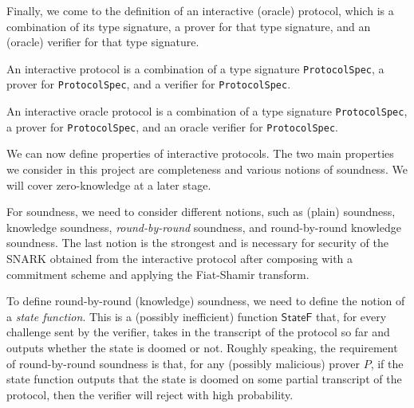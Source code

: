 Finally, we come to the definition of an interactive (oracle) protocol, which is a combination of its type signature, a prover for that type signature, and an (oracle) verifier for that type signature.

\begin{definition}
    \label{def:interactive_protocol}
    An interactive protocol is a combination of a type signature \verb|ProtocolSpec|, a prover for \verb|ProtocolSpec|, and a verifier for \verb|ProtocolSpec|.
\end{definition}

\begin{definition}\label{def:interactive_oracle_protocol}
    An interactive oracle protocol is a combination of a type signature \verb|ProtocolSpec|, a prover for \verb|ProtocolSpec|, and an oracle verifier for \verb|ProtocolSpec|.
\end{definition}

We can now define properties of interactive protocols. The two main properties we consider in this project are completeness and various notions of soundness. We will cover zero-knowledge at a later stage.

\begin{definition}[Completeness]
    \label{def:completeness}
\end{definition}

For soundness, we need to consider different notions, such as (plain) soundness, knowledge soundness, \emph{round-by-round} soundness, and round-by-round knowledge soundness. The last notion is the strongest and is necessary for security of the SNARK obtained from the interactive protocol after composing with a commitment scheme and applying the Fiat-Shamir transform.

\begin{definition}[Soundness]
    \label{def:soundness}
\end{definition}

\begin{definition}
    \label{def:knowledge_soundness}
\end{definition}

To define round-by-round (knowledge) soundness, we need to define the notion of a \emph{state function}. This is a (possibly inefficient) function $\mathsf{StateF}$ that, for every challenge sent by the verifier, takes in the transcript of the protocol so far and outputs whether the state is doomed or not. Roughly speaking, the requirement of round-by-round soundness is that, for any (possibly malicious) prover $P$, if the state function outputs that the state is doomed on some partial transcript of the protocol, then the verifier will reject with high probability.

